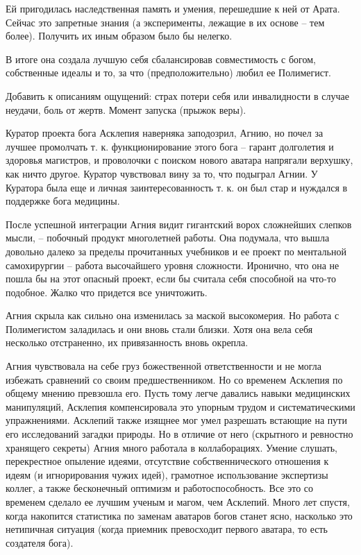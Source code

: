 \documentclass[12pt,a4paper]{article}
\begin{document}
Ей пригодилась наследственная память и умения, перешедшие к ней от Арата. Сейчас это запретные знания (а эксперименты, лежащие в их основе -- тем более). Получить их иным образом было бы нелегко.

В итоге она создала лучшую себя сбалансировав совместимость с богом, собственные идеалы и то, за что (предположительно) любил ее Полимегист.

Добавить к описаниям ощущений: страх потери себя или инвалидности в случае неудачи, боль от жертв. Момент запуска (прыжок веры).

Куратор проекта бога Асклепия наверняка заподозрил, Агнию, но почел за лучшее промолчать т. к. функционирование этого бога -- гарант долголетия и здоровья магистров, и проволочки с поиском нового аватара напрягали верхушку, как ничто другое. Куратор чувствовал вину за то, что подыграл Агнии. У Куратора была еще и личная заинтересованность т. к. он был стар и нуждался в поддержке бога медицины.

После успешной интеграции Агния видит гигантский ворох сложнейших слепков мысли, -- побочный продукт многолетней работы. Она подумала, что вышла довольно далеко за пределы прочитанных учебников и ее проект по ментальной самохирургии -- работа высочайшего уровня сложности. Иронично, что она не пошла бы на этот опасный проект, если бы считала себя способной на что-то подобное. Жалко что придется все уничтожить.

Агния скрыла как сильно она изменилась за маской высокомерия. Но работа с Полимегистом заладилась и они вновь стали близки. Хотя она вела себя несколько отстраненно, их привязанность вновь окрепла.

Агния чувствовала на себе груз божественной ответственности и не могла избежать сравнений со своим предшественником. Но со временем Асклепия по общему мнению превзошла его. Пусть тому легче давались навыки медицинских манипуляций, Асклепия компенсировала это упорным трудом и систематическими упражнениями. Асклепий также изящнее мог умел разрешать встающие на пути его исследований загадки природы. Но в отличие от него (скрытного и ревностно хранящего секреты) Агния много работала в коллаборациях. Умение слушать, перекрестное опыление идеями, отсутствие собственнического отношения к идеям (и игнорирования чужих идей), грамотное использование экспертизы коллег, а также бесконечный оптимизм и работоспособность. Все это со временем сделало ее лучшим ученым и магом, чем Асклепий. Много лет спустя, когда накопится статистика по заменам аватаров богов станет ясно, насколько это нетипичная ситуация (когда приемник превосходит первого аватара, то есть создателя бога).
\end{document}

